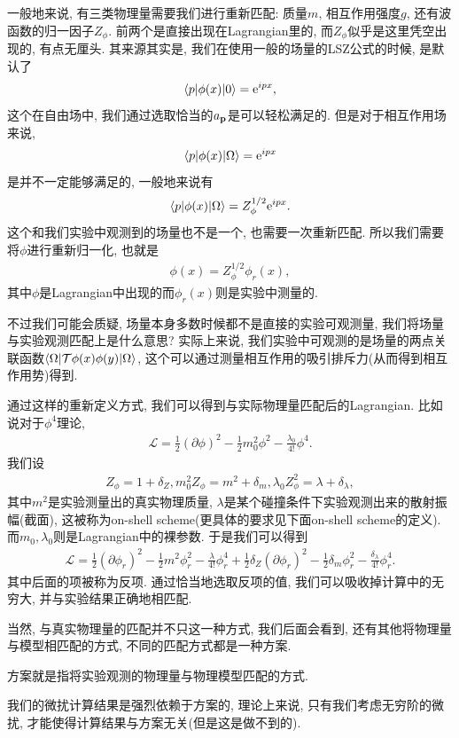 一般地来说, 有三类物理量需要我们进行重新匹配: 质量$m$, 相互作用强度$g$, 还有波函数的归一因子$Z_\phi$. 前两个是直接出现在Lagrangian里的, 而$Z_\phi$似乎是这里凭空出现的, 有点无厘头. 其来源其实是, 我们在使用一般的场量的LSZ公式的时候, 是默认了
\begin{align}
    \braket{p|\phi(x)|0}=\mathrm e^{ipx},
\end{align}
这个在自由场中, 我们通过选取恰当的$a_{\mathbf{p}}$是可以轻松满足的. 但是对于相互作用场来说, 
\begin{align}
    \braket{p|\phi(x)|\Omega}=\mathrm e^{ipx}
\end{align}
是并不一定能够满足的, 一般地来说有
\begin{align}
    \braket{p|\phi(x)|\Omega}=Z_\phi^{1/2}\mathrm e^{ipx}.
\end{align}
这个和我们实验中观测到的场量也不是一个, 也需要一次重新匹配. 所以我们需要将$\phi$进行重新归一化, 也就是
\begin{align}
    \phi(x)=Z_\phi^{1/2}\phi_r(x), 
\end{align}
其中$\phi$是Lagrangian中出现的而$\phi_r(x)$则是实验中测量的. 

不过我们可能会质疑, 场量本身多数时候都不是直接的实验可观测量, 我们将场量与实验观测匹配上是什么意思? 实际上来说, 我们实验中可观测的是场量的两点关联函数$\braket{\Omega|\mathcal T\phi(x)\phi(y)|\Omega}$, 这个可以通过测量相互作用的吸引排斥力(从而得到相互作用势)得到. 

通过这样的重新定义方式, 我们可以得到与实际物理量匹配后的Lagrangian. 比如说对于$\phi^4$理论, 
\begin{align}
    \mathcal L=\frac12(\partial\phi)^2-\frac12m_0^2\phi^2-\frac{\lambda_0}{4!}\phi^4.
\end{align}
我们设
\begin{align}
    Z_\phi=1+\delta_Z, m_0^2Z_\phi=m^2+\delta_m, \lambda_0Z_\phi^2=\lambda+\delta_\lambda,
\end{align}
其中$m^2$是实验测量出的真实物理质量, $\lambda$是某个碰撞条件下实验观测出来的散射振幅(截面), 这被称为on-shell scheme(更具体的要求见下面on-shell scheme的定义). 而$m_0, \lambda_0$则是Lagrangian中的裸参数. 于是我们可以得到
\begin{align}
    \mathcal L=\frac12(\partial\phi_r)^2-\frac12 m^2\phi_r^2-\frac\lambda{4!}\phi_r^4+\frac12\delta_Z(\partial\phi_r)^2-\frac12\delta_m\phi_r^2-\frac{\delta_\lambda}{4!}\phi_r^4.
\end{align}
其中后面的项被称为反项. 通过恰当地选取反项的值, 我们可以吸收掉计算中的无穷大, 并与实验结果正确地相匹配.

当然, 与真实物理量的匹配并不只这一种方式, 我们后面会看到, 还有其他将物理量与模型相匹配的方式, 不同的匹配方式都是一种方案.
\begin{definition}[方案(Scheme)]
    方案就是指将实验观测的物理量与物理模型匹配的方式.
\end{definition}
我们的微扰计算结果是强烈依赖于方案的, 理论上来说, 只有我们考虑无穷阶的微扰, 才能使得计算结果与方案无关(但是这是做不到的).

